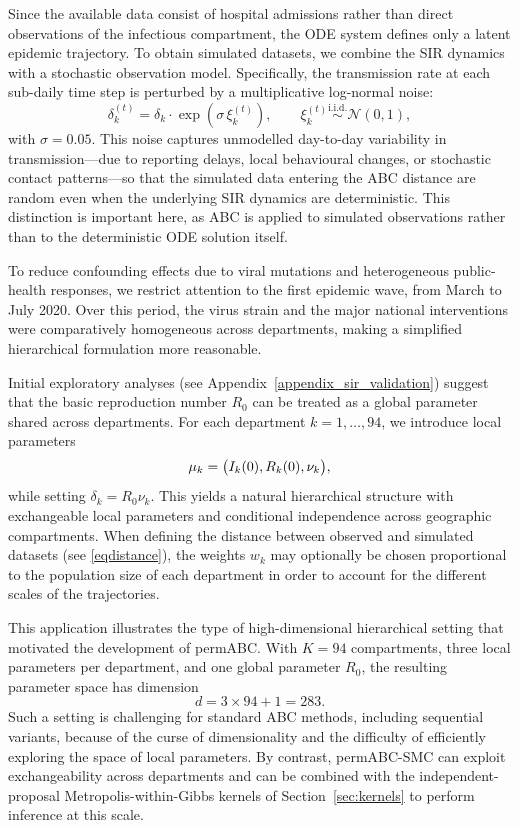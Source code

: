 Since the available data consist of hospital admissions rather than direct observations of the infectious compartment, the ODE system defines only a latent epidemic trajectory. To obtain simulated datasets, we combine the SIR dynamics with a stochastic observation model. Specifically, the transmission rate at each sub-daily time step is perturbed by a multiplicative log-normal noise:
\[
\delta_k^{(t)} = \delta_k \cdot \exp(\sigma \, \xi_k^{(t)}), \qquad \xi_k^{(t)} \overset{\text{i.i.d.}}{\sim} \mathcal{N}(0,1),
\]
with \(\sigma = 0.05\). This noise captures unmodelled day-to-day variability in transmission---due to reporting delays, local behavioural changes, or stochastic contact patterns---so that the simulated data entering the ABC distance are random even when the underlying SIR dynamics are deterministic. This distinction is important here, as ABC is applied to simulated observations rather than to the deterministic ODE solution itself.

To reduce confounding effects due to viral mutations and heterogeneous public-health responses, we restrict attention to the first epidemic wave, from March to July 2020. Over this period, the virus strain and the major national interventions were comparatively homogeneous across departments, making a simplified hierarchical formulation more reasonable.

Initial exploratory analyses (see Appendix~\ref{appendix_sir_validation}) suggest that the basic reproduction number \(R_0\) can be treated as a global parameter shared across departments. For each department \(k=1,\dots,94\), we introduce local parameters
\[
\mu_k = \bigl(I_k(0), R_k(0), \nu_k\bigr),
\]
while setting \(\delta_k = R_0 \nu_k\). This yields a natural hierarchical structure with exchangeable local parameters and conditional independence across geographic compartments. When defining the distance between observed and simulated datasets (see \eqref{eqdistance}), the weights \(w_k\) may optionally be chosen proportional to the population size of each department in order to account for the different scales of the trajectories.

This application illustrates the type of high-dimensional hierarchical setting that motivated the development of permABC. With \(K=94\) compartments, three local parameters per department, and one global parameter \(R_0\), the resulting parameter space has dimension
\[
d = 3 \times 94 + 1 = 283.
\]
Such a setting is challenging for standard ABC methods, including sequential variants, because of the curse of dimensionality and the difficulty of efficiently exploring the space of local parameters. By contrast, permABC-SMC can exploit exchangeability across departments and can be combined with the independent-proposal Metropolis-within-Gibbs kernels of Section~\ref{sec:kernels} to perform inference at this scale.

